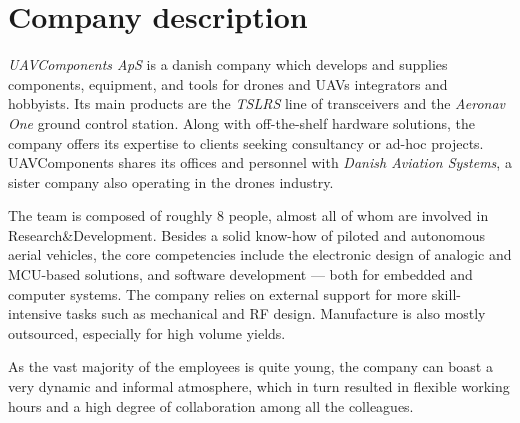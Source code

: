\section{Company description}

\emph{UAVComponents ApS} is a danish company which develops and supplies components, equipment, and tools for drones and UAVs integrators and hobbyists.
Its main products are the \emph{TSLRS} line of transceivers and the \emph{Aeronav One} ground control station.
Along with off-the-shelf hardware solutions, the company offers its expertise to clients seeking consultancy or ad-hoc projects.
UAVComponents shares its offices and personnel with \emph{Danish Aviation Systems}, a sister company also operating in the drones industry.

The team is composed of roughly 8 people, almost all of whom are involved in Research\&Development.
Besides a solid know-how of piloted and autonomous aerial vehicles, the core competencies include the electronic design of analogic and MCU-based solutions, and software development --- both for embedded and computer systems.
The company relies on external support for more skill-intensive tasks such as mechanical and RF design.
Manufacture is also mostly outsourced, especially for high volume yields.

As the vast majority of the employees is quite young, the company can boast a very dynamic and informal atmosphere, which in turn resulted in flexible working hours and a high degree of collaboration among all the colleagues.
